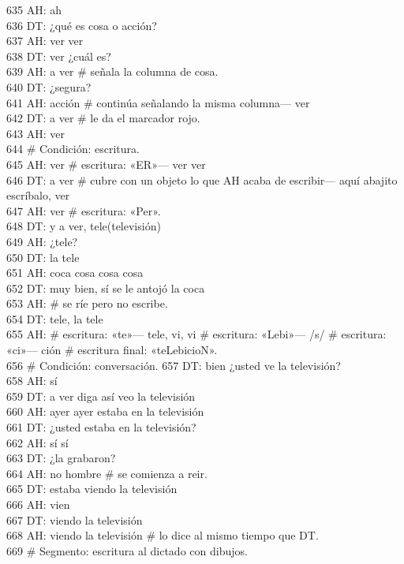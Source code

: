 635 AH: ah\\
636 DT: ¿qué es cosa o acción?\\
637 AH: ver ver\\
638 DT: ver ¿cuál es?\\
639 AH: a ver \# señala la columna de cosa.\\
640 DT: ¿segura?\\
641 AH: acción \# continúa señalando la misma columna--- ver\\
642 DT: a ver \# le da el marcador rojo.\\
643 AH: ver\\
644 \# Condición: escritura.\\
645 AH: ver \# escritura: «ER»--- ver ver \\
646 DT: a ver \# cubre con un objeto lo que AH acaba de escribir--- aquí abajito escríbalo, ver\\
647 AH: ver \# escritura: «Per».\\
648 DT: y a ver, tele(televisión)\\
649 AH: ¿tele?\\
650 DT: la tele\\
651 AH: coca cosa cosa cosa\\
652 DT: muy bien, sí se le antojó la coca\\
653 AH: \# se ríe pero no escribe.\\
654 DT: tele, la tele\\
655 AH: \# escritura: «te»--- tele, vi, vi \# escritura: «Lebi»--- /s/ \# escritura: «ci»--- ción \# escritura final: «teLebicioN».\\
656 \# Condición: conversación.
657 DT: bien ¿usted ve la televisión?\\
658 AH: sí\\
659 DT: a ver diga así veo la televisión\\
660 AH: ayer ayer estaba en la televisión\\
661 DT: ¿usted estaba en la televisión?\\
662 AH: sí sí\\
663 DT: ¿la grabaron?\\
664 AH: no hombre \# se comienza a reir.\\
665 DT: estaba viendo la televisión\\
666 AH: vien\\
667 DT: viendo la televisión\\
668 AH: viendo la televisión \# lo dice al mismo tiempo que DT.\\
669 \# Segmento: escritura al dictado con dibujos.\\
